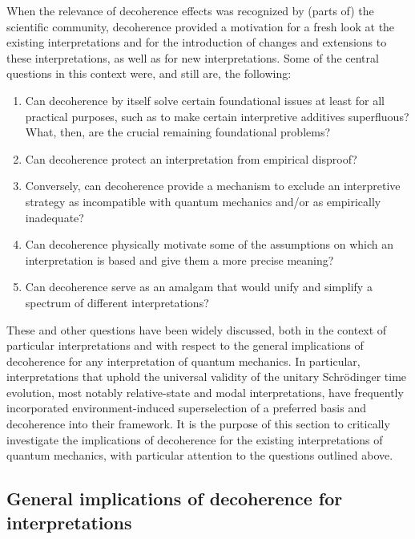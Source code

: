\documentclass[rmp,aps,amsmath,amsfonts,noshowkeys,noshowpacs,12pt]{revtex4}
\begin{document}
When the relevance of decoherence effects was recognized by (parts of)
the scientific community, decoherence provided a motivation for a
fresh look at the existing interpretations and for the introduction of
changes and extensions to these interpretations, as well as for new
interpretations.  Some of the central questions in this context were,
and still are, the following:
%
\begin{enumerate} 
  
\item Can decoherence by itself solve certain foundational issues at
  least for all practical purposes, such as to make certain
  interpretive additives superfluous? What, then, are the crucial
  remaining foundational problems?
  
\item Can decoherence protect an interpretation from empirical
  disproof?
  
\item Conversely, can decoherence provide a mechanism to
  exclude an interpretive strategy as incompatible with
  quantum mechanics and/or as empirically inadequate?
  
\item Can decoherence physically motivate some of the assumptions on
  which an interpretation is based and give them a more precise
  meaning?
  
\item Can decoherence serve as an amalgam that would unify and
  simplify a spectrum of different interpretations?

\end{enumerate}
%
These and other questions have been widely discussed, both in the
context of particular interpretations and with respect to the general
implications of decoherence for any interpretation of quantum
mechanics.  In particular, interpretations that uphold the universal
validity of the unitary Schr\"odinger time evolution, most notably
relative-state and modal interpretations, have frequently incorporated
environment-induced superselection of a preferred basis and
decoherence into their framework. It is the purpose of this section to
critically investigate the implications of decoherence for the
existing interpretations of quantum mechanics, with particular
attention to the questions outlined above.


\subsection{General implications of decoherence for interpretations}
\end{document}
